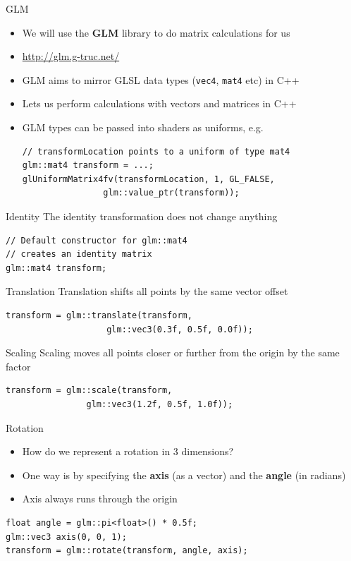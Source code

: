 \begin{frame}[fragile]{GLM}
	\begin{itemize}
		\pause\item We will use the \textbf{GLM} library to do matrix calculations for us
		\pause\item \url{http://glm.g-truc.net/}
		\pause\item GLM aims to mirror GLSL data types (\lstinline{vec4}, \lstinline{mat4} etc) in C++
		\pause\item Lets us perform calculations with vectors and matrices in C++
		\pause\item GLM types can be passed into shaders as uniforms, e.g.
			\begin{lstlisting}
// transformLocation points to a uniform of type mat4
glm::mat4 transform = ...;
glUniformMatrix4fv(transformLocation, 1, GL_FALSE,
				glm::value_ptr(transform));
			\end{lstlisting}
	\end{itemize}
\end{frame}

\begin{frame}[fragile]{Identity}
	\pause The identity transformation does not change anything
	\pause \begin{lstlisting}
// Default constructor for glm::mat4
// creates an identity matrix
glm::mat4 transform;
	\end{lstlisting}
\end{frame}

\begin{frame}[fragile]{Translation}
	\pause Translation shifts all points by the same vector offset
	\pause \begin{lstlisting}
transform = glm::translate(transform,
					glm::vec3(0.3f, 0.5f, 0.0f));
	\end{lstlisting}
\end{frame}

\begin{frame}[fragile]{Scaling}
	\pause Scaling moves all points closer or further from the origin by the same factor
	\pause \begin{lstlisting}
transform = glm::scale(transform,
				glm::vec3(1.2f, 0.5f, 1.0f));
	\end{lstlisting}
\end{frame}

\begin{frame}[fragile]{Rotation}
	\begin{itemize}
		\pause\item How do we represent a rotation in 3 dimensions?
		\pause\item One way is by specifying the \textbf{axis} (as a vector) and the \textbf{angle} (in radians)
		\pause\item Axis always runs through the origin
	\end{itemize}
	\pause \begin{lstlisting}
float angle = glm::pi<float>() * 0.5f;
glm::vec3 axis(0, 0, 1);
transform = glm::rotate(transform, angle, axis);
	\end{lstlisting}
\end{frame}

